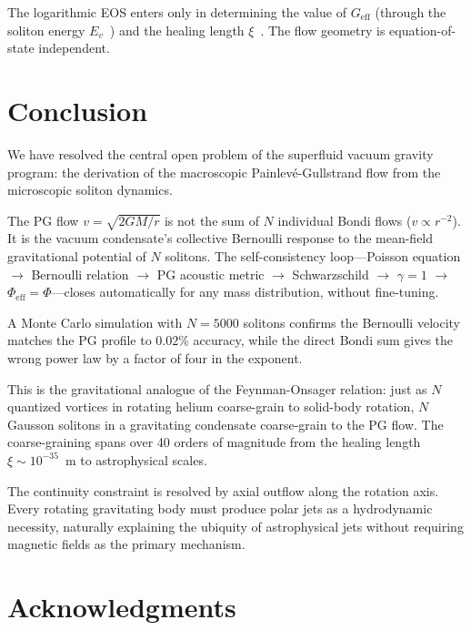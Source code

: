 \documentclass[12pt, a4paper]{article}
\newcommand{\Geff}{G_{\mathrm{eff}}}
\begin{document}
The logarithmic EOS enters only in determining the
value of $\Geff$ (through the soliton energy
$E_v$~\cite{kulangiev_2026b}) and the healing length
$\xi$~\cite{kulangiev_2026e}. The flow geometry is
equation-of-state independent.


\section{Conclusion}
\label{sec:conclusion}

We have resolved the central open problem of the
superfluid vacuum gravity program: the derivation of
the macroscopic Painlev\'{e}-Gullstrand flow from the
microscopic soliton dynamics.

The PG flow $v = \sqrt{2GM/r}$ is not the sum of
$N$ individual Bondi flows ($v \propto r^{-2}$). It
is the vacuum condensate's collective Bernoulli
response to the mean-field gravitational potential
of $N$ solitons. The self-consistency loop---Poisson
equation $\to$ Bernoulli relation $\to$ PG acoustic
metric $\to$ Schwarzschild $\to$ $\gamma = 1$ $\to$
$\Phi_{\mathrm{eff}} = \Phi$---closes automatically
for any mass distribution, without fine-tuning.

A Monte Carlo simulation with $N = 5000$ solitons
confirms the Bernoulli velocity matches the PG
profile to $0.02\%$ accuracy, while the direct Bondi
sum gives the wrong power law by a factor of four in
the exponent.

This is the gravitational analogue of the
Feynman-Onsager relation: just as $N$ quantized
vortices in rotating helium coarse-grain to
solid-body rotation, $N$ Gausson solitons in a
gravitating condensate coarse-grain to the PG flow.
The coarse-graining spans over 40 orders of
magnitude from the healing length
$\xi \sim 10^{-35}$~m to astrophysical scales.

The continuity constraint is resolved by axial
outflow along the rotation axis. Every rotating
gravitating body must produce polar jets as a
hydrodynamic necessity, naturally explaining the
ubiquity of astrophysical jets without requiring
magnetic fields as the primary mechanism.


\section*{Acknowledgments}
\end{document}
